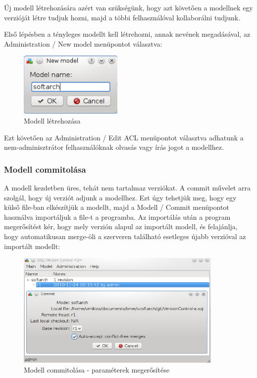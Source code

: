\documentclass[a4paper,12pt]{article}
\begin{document}
Új modell létrehozására azért van szükségünk, hogy azt követően a modellnek egy
verzióját létre tudjuk hozni, majd a többi felhasználóval kollaborálni tudjunk.

Első lépésben a tényleges modellt kell létrehozni, annak nevének megadásával,
az Administration / New model menüpontot választva:

\begin{figure}[H]
\centering
\includegraphics[width=50mm,keepaspectratio]{model-create.png}
\caption{Modell létrehozása}
\end{figure}

Ezt követően az Administration / Edit ACL menüpontot választva adhatunk a
nem-adminisztrátor felhasználóknak olvasás vagy írás jogot a modellhez.

\subsubsection{Modell commitolása}

A modell kezdetben üres, tehát nem tartalmaz verziókat. A commit művelet arra
szolgál, hogy új verziót adjunk a modellhez. Ezt úgy tehetjük meg, hogy egy
külső file-ban elkészítjük a modellt, majd a Modell / Commit menüpontot
használva importáljuk a file-t a programba. Az importálás után a program
megerősítést kér, hogy mely verzión alapul az importált modell, és felajánlja,
hogy automatikusan merge-öli a szerveren található esetleges újabb verzióval az
importált modellt:

\begin{figure}[H]
\centering
\includegraphics[width=100mm,keepaspectratio]{model-commit-askbase.png}
\caption{Modell commitolása - paraméterek megerősítése}
\end{figure}
\end{document}
